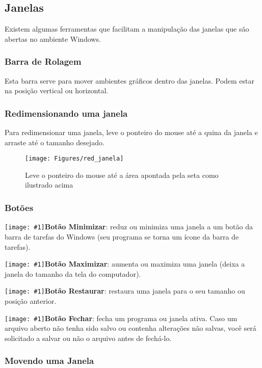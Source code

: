 \documentclass[hidelinks,12pt]{article}
\newcommand{\icon}[1]{\texttt{[image: \#1]}}
\begin{document}
\subsection{Janelas}
Existem algumas ferramentas que facilitam a manipulação das janelas que são abertas no ambiente Windows.

\subsubsection{Barra de Rolagem}
Esta barra serve para mover ambientes gráficos dentro das janelas. Podem estar na posição vertical ou horizontal.

\subsubsection{Redimensionando uma janela}
Para redimensionar uma janela, leve o ponteiro do mouse até a quina da janela e arraste até o tamanho desejado.

\begin{figure}[!h]
	\centering
	\texttt{[image: Figures/red\_janela]}
	\caption{Leve o ponteiro do mouse até a área apontada pela seta como ilustrado acima}
	\label{fig:redimensionando janela}
\end{figure}


\subsubsection{Botões}

\noindent \icon{Figures/minimizar}{\bf Botão Minimizar}: reduz ou minimiza uma janela a um botão da barra de tarefas do Windows (seu programa se torna um ícone da barra de tarefas).

\noindent\icon{Figures/maximizar}{\bf Botão Maximizar}: aumenta ou maximiza uma janela (deixa a janela do tamanho da tela do computador).

\noindent\icon{Figures/restaurar}{\bf Botão Restaurar}: restaura uma janela para o seu tamanho ou posição anterior.

\noindent\icon{Figures/fechar}{\bf Botão Fechar}: fecha um programa ou janela ativa. Caso um arquivo aberto não tenha sido salvo ou contenha alterações não salvas, você será solicitado a salvar ou não o arquivo antes de fechá-lo.

\subsubsection{Movendo uma Janela}
\end{document}
